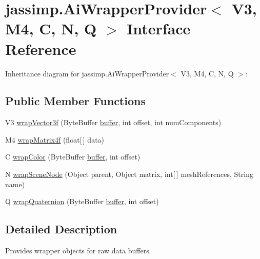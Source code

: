 \hypertarget{interfacejassimp_1_1_ai_wrapper_provider_3_01_v3_00_01_m4_00_01_c_00_01_n_00_01_q_01_4}{\section{jassimp.\+Ai\+Wrapper\+Provider$<$ V3, M4, C, N, Q $>$ Interface Reference}
\label{interfacejassimp_1_1_ai_wrapper_provider_3_01_v3_00_01_m4_00_01_c_00_01_n_00_01_q_01_4}
}


Inheritance diagram for jassimp.\+Ai\+Wrapper\+Provider$<$ V3, M4, C, N, Q $>$\+:
\subsection*{Public Member Functions}
\begin{DoxyCompactItemize}
\item 
V3 \hyperlink{interfacejassimp_1_1_ai_wrapper_provider_3_01_v3_00_01_m4_00_01_c_00_01_n_00_01_q_01_4_a740fd7589d85350202ba54bc9d42894d}{wrap\+Vector3f} (Byte\+Buffer \hyperlink{structbuffer}{buffer}, int offset, int num\+Components)
\item 
M4 \hyperlink{interfacejassimp_1_1_ai_wrapper_provider_3_01_v3_00_01_m4_00_01_c_00_01_n_00_01_q_01_4_a5628d0357d73861c1f8070ed21fd3918}{wrap\+Matrix4f} (float\mbox{[}$\,$\mbox{]} data)
\item 
C \hyperlink{interfacejassimp_1_1_ai_wrapper_provider_3_01_v3_00_01_m4_00_01_c_00_01_n_00_01_q_01_4_a4adc8ceb42dd82e396727ec348287b6d}{wrap\+Color} (Byte\+Buffer \hyperlink{structbuffer}{buffer}, int offset)
\item 
N \hyperlink{interfacejassimp_1_1_ai_wrapper_provider_3_01_v3_00_01_m4_00_01_c_00_01_n_00_01_q_01_4_a7a46e64a036f6a5b802f28b24e17788c}{wrap\+Scene\+Node} (Object parent, Object matrix, int\mbox{[}$\,$\mbox{]} mesh\+References, String name)
\item 
Q \hyperlink{interfacejassimp_1_1_ai_wrapper_provider_3_01_v3_00_01_m4_00_01_c_00_01_n_00_01_q_01_4_aa81f22967b4a2e23a4fcdd6d0e5d35c7}{wrap\+Quaternion} (Byte\+Buffer \hyperlink{structbuffer}{buffer}, int offset)
\end{DoxyCompactItemize}


\subsection{Detailed Description}
Provides wrapper objects for raw data buffers.

